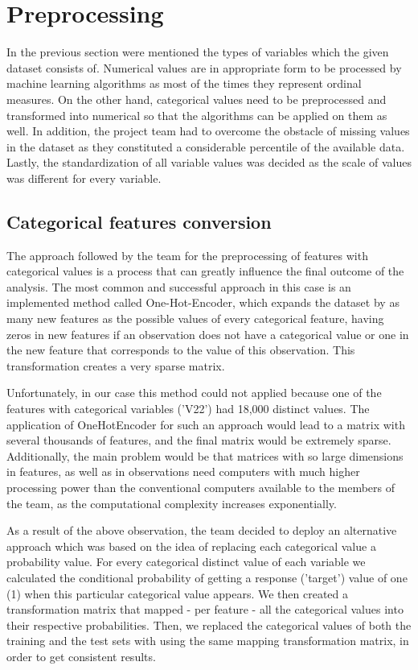 \documentclass[conference, onecolumn]{IEEEtran}
\begin{document}
\section{Preprocessing}
In the previous section were mentioned the types of variables which the given dataset consists of. Numerical values are in appropriate form to be processed by machine learning algorithms as most of the times they represent ordinal measures. On the other hand, categorical values need to be preprocessed and transformed into numerical so that the algorithms can be applied on them as well. In addition, the project team had to overcome the obstacle of missing values in the dataset as they constituted a considerable percentile of the available data. Lastly, the standardization of all variable values was decided as the scale of values was different for every variable. 

\subsection{Categorical features conversion}
The approach followed by the team for the preprocessing of features with categorical values is a process that can greatly influence the final outcome of the analysis. The most common and successful approach in this case is an implemented method called One-Hot-Encoder, which expands the dataset by as many new features as the possible values of every categorical feature, having zeros in new features if an observation does not have a categorical value or one in the new feature that corresponds to the value of this observation. This transformation creates a very sparse matrix.

Unfortunately, in our case this method could not applied because one of the features with categorical variables ('V22') had 18,000 distinct values. The application of OneHotEncoder for such an approach would lead to a matrix with several thousands of features, and the final matrix would be extremely sparse. Additionally, the main problem would be that matrices with so large dimensions in features, as well as in observations need computers with much higher processing power than the conventional computers available to the members of the team, as the computational complexity increases exponentially.

As a result of the above observation, the team decided to deploy an alternative approach which was based on the idea of replacing each categorical value a probability value. For every categorical distinct value of each variable we calculated the conditional probability of getting a response ('target') value of one (1) when this particular categorical value appears. We then created a transformation matrix that mapped - per feature - all the categorical values into their respective probabilities. Then, we replaced the categorical values of both the training and the test sets with using the same mapping transformation matrix, in order to get consistent results. 
\end{document}
